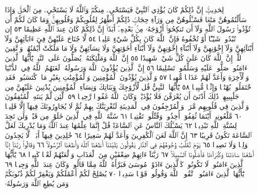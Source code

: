 لِحَدِيثٍۚ إِنَّ ذَٰلِكُمْ كَانَ يُؤْذِي ٱلنَّبِيَّ فَيَسْتَحْيِۦ مِنكُمْۖ
وَٱللَّهُ لَا يَسْتَحْيِۦ مِنَ ٱلْحَقِّۚ وَإِذَا سَأَلْتُمُوهُنَّ مَتَٰعࣰا فَسْـَٔلُوهُنَّ
مِن وَرَآءِ حِجَابࣲۚ ذَٰلِكُمْ أَطْهَرُ لِقُلُوبِكُمْ وَقُلُوبِهِنَّۚ
وَمَا كَانَ لَكُمْ أَن تُؤْذُوا۟ رَسُولَ ٱللَّهِ وَلَآ أَن تَنكِحُوٓا۟ أَزْوَٰجَهُۥ
مِنۢ بَعْدِهِۦٓ أَبَدًاۚ إِنَّ ذَٰلِكُمْ كَانَ عِندَ ٱللَّهِ عَظِيمًا ٥٣
إِن تُبْدُوا۟ شَيْـًٔا أَوْ تُخْفُوهُ فَإِنَّ ٱللَّهَ كَانَ بِكُلِّ شَيْءٍ عَلِيمࣰا ٥٤
لَّا جُنَاحَ عَلَيْهِنَّ فِيٓ ءَابَآئِهِنَّ وَلَآ أَبْنَآئِهِنَّ وَلَآ إِخْوَٰنِهِنَّ وَلَآ
أَبْنَآءِ إِخْوَٰنِهِنَّ وَلَآ أَبْنَآءِ أَخَوَٰتِهِنَّ وَلَا نِسَآئِهِنَّ وَلَا مَا مَلَكَتْ
أَيْمَٰنُهُنَّۗ وَٱتَّقِينَ ٱللَّهَۚ إِنَّ ٱللَّهَ كَانَ عَلَىٰ كُلِّ شَيْءࣲ شَهِيدًا ٥٥
إِنَّ ٱللَّهَ وَمَلَٰٓئِكَتَهُۥ يُصَلُّونَ عَلَى ٱلنَّبِيِّۚ يَٰٓأَيُّهَا ٱلَّذِينَ
ءَامَنُوا۟ صَلُّوا۟ عَلَيْهِ وَسَلِّمُوا۟ تَسْلِيمًا ٥٦ إِنَّ ٱلَّذِينَ يُؤْذُونَ
ٱللَّهَ وَرَسُولَهُۥ لَعَنَهُمُ ٱللَّهُ فِي ٱلدُّنْيَا وَٱلْأٓخِرَةِ وَأَعَدَّ لَهُمْ عَذَابࣰا
مُّهِينࣰا ٥٧ وَٱلَّذِينَ يُؤْذُونَ ٱلْمُؤْمِنِينَ وَٱلْمُؤْمِنَٰتِ بِغَيْرِ
مَا ٱكْتَسَبُوا۟ فَقَدِ ٱحْتَمَلُوا۟ بُهْتَٰنࣰا وَإِثْمࣰا مُّبِينࣰا ٥٨
يَٰٓأَيُّهَا ٱلنَّبِيُّ قُل لِّأَزْوَٰجِكَ وَبَنَاتِكَ وَنِسَآءِ ٱلْمُؤْمِنِينَ
يُدْنِينَ عَلَيْهِنَّ مِن جَلَٰبِيبِهِنَّۚ ذَٰلِكَ أَدْنَىٰٓ أَن يُعْرَفْنَ فَلَا
يُؤْذَيْنَۗ وَكَانَ ٱللَّهُ غَفُورࣰا رَّحِيمࣰا ٥٩۞ لَّئِن لَّمْ يَنتَهِ ٱلْمُنَٰفِقُونَ
وَٱلَّذِينَ فِي قُلُوبِهِم مَّرَضࣱ وَٱلْمُرْجِفُونَ فِي ٱلْمَدِينَةِ
لَنُغْرِيَنَّكَ بِهِمْ ثُمَّ لَا يُجَاوِرُونَكَ فِيهَآ إِلَّا قَلِيلࣰا ٦٠ مَّلْعُونِينَۖ
أَيْنَمَا ثُقِفُوٓا۟ أُخِذُوا۟ وَقُتِّلُوا۟ تَقْتِيلࣰا ٦١ سُنَّةَ ٱللَّهِ فِي
ٱلَّذِينَ خَلَوْا۟ مِن قَبْلُۖ وَلَن تَجِدَ لِسُنَّةِ ٱللَّهِ تَبْدِيلࣰا ٦٢
يَسْـَٔلُكَ ٱلنَّاسُ عَنِ ٱلسَّاعَةِۖ قُلْ إِنَّمَا عِلْمُهَا عِندَ ٱللَّهِۚ وَمَا يُدْرِيكَ
لَعَلَّ ٱلسَّاعَةَ تَكُونُ قَرِيبًا ٦٣ إِنَّ ٱللَّهَ لَعَنَ ٱلْكَٰفِرِينَ وَأَعَدَّ
لَهُمْ سَعِيرًا ٦٤ خَٰلِدِينَ فِيهَآ أَبَدࣰاۖ لَّا يَجِدُونَ وَلِيࣰّا وَلَا نَصِيرࣰا ٦٥
يَوْمَ تُقَلَّبُ وُجُوهُهُمْ فِي ٱلنَّارِ يَقُولُونَ يَٰلَيْتَنَآ أَطَعْنَا ٱللَّهَ
وَأَطَعْنَا ٱلرَّسُولَا۠ ٦٦ وَقَالُوا۟ رَبَّنَآ إِنَّآ أَطَعْنَا سَادَتَنَا وَكُبَرَآءَنَا
فَأَضَلُّونَا ٱلسَّبِيلَا۠ ٦٧ رَبَّنَآ ءَاتِهِمْ ضِعْفَيْنِ مِنَ ٱلْعَذَابِ
وَٱلْعَنْهُمْ لَعْنࣰا كَبِيرࣰا ٦٨ يَٰٓأَيُّهَا ٱلَّذِينَ ءَامَنُوا۟ لَا تَكُونُوا۟ كَٱلَّذِينَ
ءَاذَوْا۟ مُوسَىٰ فَبَرَّأَهُ ٱللَّهُ مِمَّا قَالُوا۟ۚ وَكَانَ عِندَ ٱللَّهِ وَجِيهࣰا ٦٩
يَٰٓأَيُّهَا ٱلَّذِينَ ءَامَنُوا۟ ٱتَّقُوا۟ ٱللَّهَ وَقُولُوا۟ قَوْلࣰا سَدِيدࣰا ٧٠ يُصْلِحْ
لَكُمْ أَعْمَٰلَكُمْ وَيَغْفِرْ لَكُمْ ذُنُوبَكُمْۗ وَمَن يُطِعِ ٱللَّهَ وَرَسُولَهُۥ
